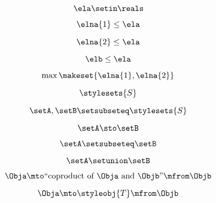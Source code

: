 \begin{forslides}
    \begin{equation}
        \label{eq:feedback-139}
        \ela\setin \reals
    \end{equation}

    \begin{equation}
        \label{eq:feedback-140}
        \elna{1}\leq \ela
    \end{equation}

    \begin{equation}
        \label{eq:feedback-141}
        \elna{2}\leq \ela
    \end{equation}

    \begin{equation}
        \label{eq:feedback-142}
        \elb\leq \ela
    \end{equation}

    \begin{equation}
        \label{eq:feedback-143}
        \max\makeset{\elna{1},\elna{2}}
    \end{equation}

    \begin{equation}
        \label{eq:feedback-144}
        \stylesets{S}
    \end{equation}

    \begin{equation}
        \label{eq:feedback-145}
        \setA,\setB\setsubseteq \stylesets{S}
    \end{equation}

    \begin{equation}
        \label{eq:feedback-146}
        \setA \sto \setB
    \end{equation}

    \begin{equation}
        \label{eq:feedback-147}
        \setA\setsubseteq \setB
    \end{equation}

    \begin{equation}
        \label{eq:feedback-148}
        \setA\setunion\setB
    \end{equation}

    \begin{equation}
        \label{eq:feedback-149}
        \Obja \mto \text{``coproduct of } \Obja \text{ and } \Objb \text{''}  \mfrom \Objb
    \end{equation}

    \begin{equation}
        \label{eq:feedback-150}
        \Obja \mto \styleobj{T} \mfrom \Objb
    \end{equation}


\end{forslides}

